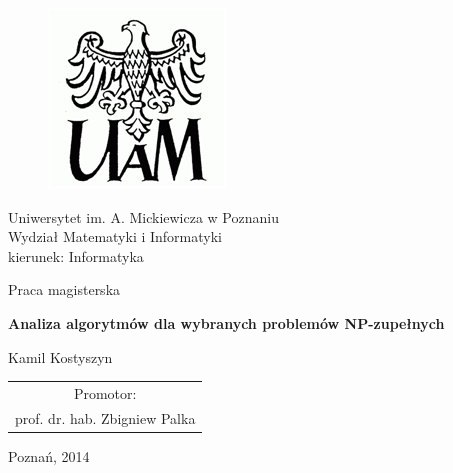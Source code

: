 \thispagestyle{empty}
\begin{figure}[h!]
\centering
\includegraphics[width=0.25\hsize]{uam_logo.jpg}
\end{figure}

\begin{center}
\Large Uniwersytet im. A. Mickiewicza w Poznaniu \\
\large Wydział Matematyki i Informatyki \\
\normalsize kierunek: Informatyka
\end{center}

\vskip0.3in
 \begin{center}
    \large\expandafter{Praca magisterska}
 \end{center}
 \begin{center}
    \huge{\textbf{Analiza algorytmów dla wybranych problemów NP-zupełnych}}\\
 \end{center}
 \vskip0.4in
 \begin{center}
    \Large\expandafter{Kamil Kostyszyn}
 \end{center}
 \vskip0.7in
 \begin{flushright}
    \begin{tabular}{c}
    Promotor: \\
    prof. dr. hab. Zbigniew Palka \\
    \end{tabular}
 \end{flushright}

 \vfill

 \begin{center}
     \rm Poznań, 2014
 \end{center}
 \newpage
